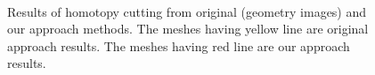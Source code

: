 \documentclass[a4paper,twoside]{article}
\begin{document}
\begin{figure}[th!]
	\hspace{20pt}
	\\
	\caption[]{Results of homotopy cutting from original (geometry images) and our approach methods. The meshes having yellow line are original approach results. The meshes having red line are our approach results.}
	\label{fig:experiment results}
\end{figure}
\end{document}
